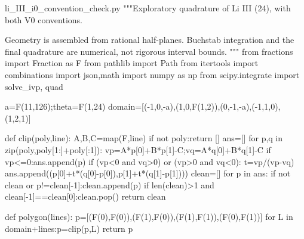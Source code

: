 \begin{filecontents*}[overwrite]{li_III_i0_convention_check.py}
"""Exploratory quadrature of Li III (24), with both V0 conventions.

Geometry is assembled from rational half-planes. Buchstab integration
and the final quadrature are numerical, not rigorous interval bounds.
"""
from fractions import Fraction as F
from pathlib import Path
from itertools import combinations
import json,math
import numpy as np
from scipy.integrate import solve_ivp, quad

a=F(11,126);theta=F(1,24)
domain=[(-1,0,-a),(1,0,F(1,2)),(0,-1,-a),(-1,1,0),(1,2,1)]

def clip(poly,line):
    A,B,C=map(F,line)
    if not poly:return []
    ans=[]
    for p,q in zip(poly,poly[1:]+poly[:1]):
        vp=A*p[0]+B*p[1]-C;vq=A*q[0]+B*q[1]-C
        if vp<=0:ans.append(p)
        if (vp<0 and vq>0) or (vp>0 and vq<0):
            t=vp/(vp-vq)
            ans.append((p[0]+t*(q[0]-p[0]),p[1]+t*(q[1]-p[1])))
    clean=[]
    for p in ans:
        if not clean or p!=clean[-1]:clean.append(p)
    if len(clean)>1 and clean[-1]==clean[0]:clean.pop()
    return clean

def polygon(lines):
    p=[(F(0),F(0)),(F(1),F(0)),(F(1),F(1)),(F(0),F(1))]
    for L in domain+lines:p=clip(p,L)
    return p


\end{filecontents*}
